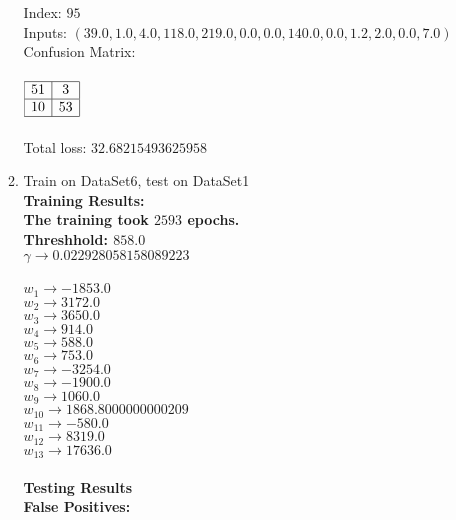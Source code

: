 \begin{enumerate}
\begin{enumerate}
					\textnormal{Index: } \( 95 \) \\
					\textnormal{Inputs: } \( (39.0, 1.0, 4.0, 118.0, 219.0, 0.0, 0.0, 140.0, 0.0, 1.2, 2.0, 0.0, 7.0) \) \\
					\textnormal{Confusion Matrix: } \\ \\
					\( 
						\begin{array}{|c|c|}
							\hline
							51 & 3 \\
							\hline							
							10 & 53 \\
							\hline
						\end{array}
					\) \\ \\
					Total loss: \(32.68215493625958\) \\
				\item{Train on DataSet6, test on DataSet1} \\
					\bf{Training Results: } \\
						\textnormal{The training took } \(2593\) \textnormal{ epochs. } \\
						\textnormal{Threshhold:} \( 858.0 \) \\
						\( \gamma \rightarrow 0.022928058158089223 \) \\ \\
						\( w_{1} \rightarrow -1853.0 \) \\
						\( w_{2} \rightarrow 3172.0 \) \\
						\( w_{3} \rightarrow 3650.0 \) \\
						\( w_{4} \rightarrow 914.0 \) \\
						\( w_{5} \rightarrow 588.0 \) \\
						\( w_{6} \rightarrow 753.0 \) \\
						\( w_{7} \rightarrow -3254.0 \) \\
						\( w_{8} \rightarrow -1900.0 \) \\
						\( w_{9} \rightarrow 1060.0 \) \\
						\( w_{10} \rightarrow 1868.8000000000209 \) \\
						\( w_{11} \rightarrow -580.0 \) \\
						\( w_{12} \rightarrow 8319.0 \) \\
						\( w_{13} \rightarrow 17636.0 \) \\ \\
					\bf{Testing Results} \\
						\textnormal{False Positives:} \\ 

\end{enumerate}
\end{enumerate}
